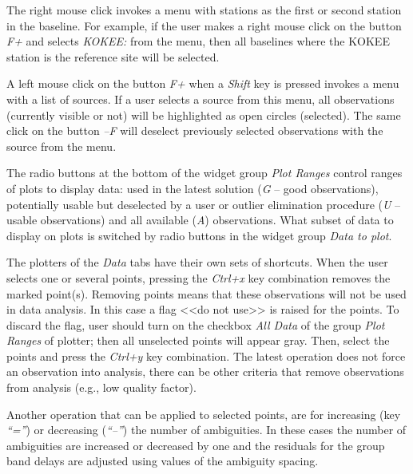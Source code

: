 \documentclass [10pt,letterpaper]{report}
\begin{document}
The right mouse click invokes
a menu with stations as the first or second station in the baseline. For
example, if the user makes a right mouse click on the button {\sl F+}
and selects {\sl KOKEE:} from the menu, then all baselines where the
KOKEE station is the reference site will be selected.

A left mouse click on the button {\sl F+} when a {\sl Shift} key is
pressed invokes a menu with a list of sources. If a user selects a source
from this menu, all observations (currently visible or not) will be
highlighted as open circles (selected). The same click on the button {\sl --F}
will deselect previously selected observations with the source from the menu.



The radio buttons at the bottom of the widget group {\sl Plot Ranges}
control ranges of plots to display data: used in the latest solution
({\sl G} -- good observations), potentially usable but deselected by
a user or outlier elimination procedure ({\sl U} -- usable observations)
and all available ({\sl A}) observations. What subset of data to
display on plots is switched by radio buttons in the widget group
{\sl Data to plot}.

The plotters of the {\sl Data} tabs have their own sets of shortcuts.
When the user selects one or several points, pressing the {\sl Ctrl+x}
key combination removes the marked point(s). Removing points means that
these observations will not be used in data analysis. In this case a
flag <<do not use>> is raised for the points. To discard the flag, user
should turn on the checkbox {\sl All Data} of the group {\sl Plot
Ranges} of plotter; then all unselected points will appear gray. Then,
select the points and press the {\sl Ctrl+y} key combination. The
latest operation does not force an observation into analysis, there can
be other criteria that remove observations from analysis (e.g., low
quality factor).

Another operation that can be applied to selected points, are for
increasing (key {\sl ``=''}) or decreasing ({\sl ``--''}) the number of
ambiguities. In these cases the number of ambiguities are increased or
decreased by one and the residuals for the group band delays are
adjusted using values of the ambiguity spacing.
\end{document}
